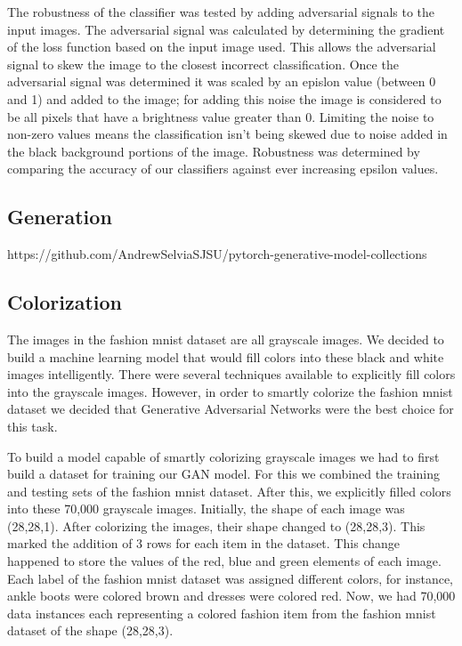 \documentclass[conference]{IEEEtran}
\begin{document}
    The robustness of the classifier was tested by adding adversarial signals to the input images. The adversarial signal was calculated by determining the gradient of the loss function based on the input image used. This allows the adversarial signal to skew the image to the closest incorrect classification. Once the adversarial signal was determined it was scaled by an epislon value (between 0 and 1) and added to the image; for adding this noise the image is considered to be all pixels that have a brightness value greater than 0. Limiting the noise to non-zero values means the classification isn't being skewed due to noise added in the black background portions of the image. Robustness was determined by comparing the accuracy of our classifiers against ever increasing epsilon values.

    \subsection{Generation}\label{subsec:implementation-generation}

    https://github.com/AndrewSelviaSJSU/pytorch-generative-model-collections

    \subsection{Colorization}\label{subsec:implementation-colorization}
	
	The images in the fashion mnist dataset are all grayscale images. We decided to build a machine learning model that would fill colors into these black and white images intelligently. There were several techniques available to explicitly fill colors into the grayscale images. However, in order to smartly colorize the fashion mnist dataset we decided that Generative Adversarial Networks were the best choice for this task. 

	To build a model capable of smartly colorizing grayscale images we had to first build a dataset for training our GAN model. For this we combined the training and testing sets of the fashion mnist dataset. After this, we explicitly filled colors into these 70,000 grayscale images. Initially, the shape of each image was (28,28,1). After colorizing the images, their shape changed to (28,28,3). This marked the addition of 3 rows for each item in the dataset. This change happened to store the values of the red, blue and green elements of each image. Each label of the fashion mnist dataset was assigned different colors, for instance, ankle boots were colored brown and dresses were colored red. Now, we had 70,000 data instances each representing a colored fashion item from the fashion mnist dataset of the shape (28,28,3).
\end{document}
